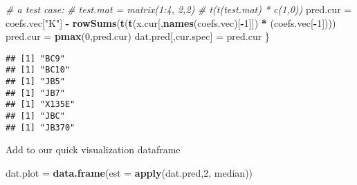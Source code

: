 \documentclass[
]{article}
\newenvironment{Shaded}{\begin{snugshade}}{\end{snugshade}}
\newcommand{\AttributeTok}[1]{\textcolor[rgb]{0.13,0.29,0.53}{#1}}
\newcommand{\CommentTok}[1]{\textcolor[rgb]{0.56,0.35,0.01}{\textit{#1}}}
\newcommand{\DecValTok}[1]{\textcolor[rgb]{0.00,0.00,0.81}{#1}}
\newcommand{\FunctionTok}[1]{\textcolor[rgb]{0.13,0.29,0.53}{\textbf{#1}}}
\newcommand{\NormalTok}[1]{#1}
\newcommand{\OtherTok}[1]{\textcolor[rgb]{0.56,0.35,0.01}{#1}}
\newcommand{\SpecialCharTok}[1]{\textcolor[rgb]{0.81,0.36,0.00}{\textbf{#1}}}
\newcommand{\StringTok}[1]{\textcolor[rgb]{0.31,0.60,0.02}{#1}}
\begin{document}
\begin{Shaded}
\begin{Highlighting}[]
  \CommentTok{\# a test case:}
  \CommentTok{\# test.mat = matrix(1:4, 2,2)}
  \CommentTok{\# t(t(test.mat) * c(1,0))}
\NormalTok{  pred.cur }\OtherTok{=}\NormalTok{ coefs.vec[}\StringTok{"K"}\NormalTok{] }\SpecialCharTok{{-}} 
    \FunctionTok{rowSums}\NormalTok{(}\FunctionTok{t}\NormalTok{(}\FunctionTok{t}\NormalTok{(x.cur[,}\FunctionTok{names}\NormalTok{(coefs.vec)[}\SpecialCharTok{{-}}\DecValTok{1}\NormalTok{]]) }\SpecialCharTok{*}\NormalTok{ (coefs.vec[}\SpecialCharTok{{-}}\DecValTok{1}\NormalTok{])))}
\NormalTok{  pred.cur }\OtherTok{=} \FunctionTok{pmax}\NormalTok{(}\DecValTok{0}\NormalTok{,pred.cur)}
\NormalTok{  dat.pred[,cur.spec] }\OtherTok{=}\NormalTok{ pred.cur}
\NormalTok{\}}
\end{Highlighting}
\end{Shaded}

\begin{verbatim}
## [1] "BC9"
## [1] "BC10"
## [1] "JB5"
## [1] "JB7"
## [1] "X135E"
## [1] "JBC"
## [1] "JB370"
\end{verbatim}

\begin{Shaded}
\end{Shaded}

Add to our quick visualization dataframe

\begin{Shaded}
\begin{Highlighting}[]
\NormalTok{dat.plot }\OtherTok{=} \FunctionTok{data.frame}\NormalTok{(}\AttributeTok{est =} \FunctionTok{apply}\NormalTok{(dat.pred,}\DecValTok{2}\NormalTok{, median))}
\end{Highlighting}
\end{Shaded}
\end{document}
